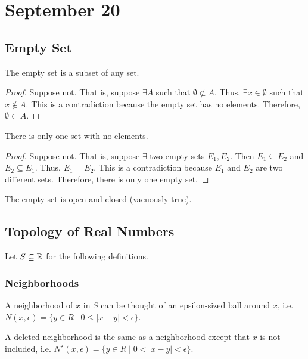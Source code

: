 \section{September 20}

\subsection{Empty Set}
\begin{theorem}
    The empty set is a subset of any set.
\end{theorem}
\begin{proof}
    Suppose not. That is, suppose $\exists A$ such that $\emptyset \not\subset A$. Thus, $\exists x \in \emptyset$ such that $x \not\in A$. This is a contradiction because the empty set has no elements. Therefore, $\emptyset \subset A$.
\end{proof}

\begin{theorem}
    There is only one set with no elements.
\end{theorem}
\begin{proof}
    Suppose not. That is, suppose $\exists$ two empty sets $E_1, E_2$. Then $E_1 \subseteq E_2$ and $E_2 \subseteq E_1$. Thus, $E_1 = E_2$. This is a contradiction because $E_1$ and $E_2$ are two different sets. Therefore, there is only one empty set.
\end{proof}
\begin{remark}
    The empty set is open and closed (vacuously true).
\end{remark}

\subsection{Topology of Real Numbers}
Let $S \subseteq \mathbb{R}$ for the following definitions.

\subsubsection{Neighborhoods}
\begin{definition}[Neighborhood]
    A neighborhood of $x$ in $S$ can be thought of an epsilon-sized ball around $x$, i.e. $N(x, \epsilon) = \{ y \in R \mid 0 \leq |x - y| < \epsilon \}$.
\end{definition}
\begin{definition}
    A deleted neighborhood is the same as a neighborhood except that $x$ is not included, i.e. $N^\star(x, \epsilon) = \{ y \in R \mid 0 < |x - y| < \epsilon \}$.
\end{definition}

